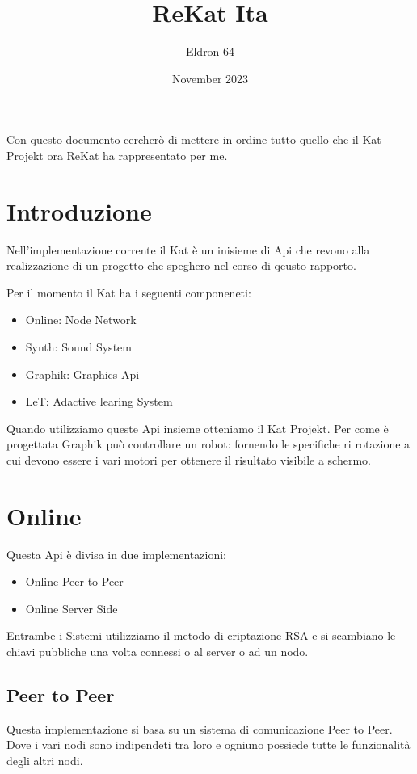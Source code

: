 \documentclass{article}
\title{ReKat Ita}
\author{Eldron 64}
\date{November 2023}
\begin{document}
	
\maketitle
Con questo documento cercherò di mettere in ordine tutto quello che il Kat Projekt ora ReKat ha rappresentato per me.

\section{Introduzione}
Nell'implementazione corrente il Kat è un inisieme di Api che revono alla realizzazione di un progetto che speghero nel corso di qeusto rapporto.

Per il momento il Kat ha i seguenti componeneti:

\begin{itemize}
    \item Online: Node Network
    \item Synth: Sound System 
    \item Graphik: Graphics Api 
    \item LeT: Adactive learing System
\end{itemize}

Quando utilizziamo queste Api insieme otteniamo il Kat Projekt. Per come è progettata Graphik può controllare un robot: fornendo le specifiche ri rotazione a cui devono essere i vari motori per ottenere il risultato visibile a schermo.

\section {Online}
Questa Api è divisa in due implementazioni: 

\begin{itemize}
    \item Online Peer to Peer
    \item Online Server Side
\end{itemize}

Entrambe i Sistemi utilizziamo il metodo di criptazione RSA e si scambiano le chiavi pubbliche una volta connessi o al server o ad un nodo.

\subsection{Peer to Peer}
Questa implementazione si basa su un sistema di comunicazione Peer to Peer. Dove i vari nodi sono indipendeti tra loro e ogniuno possiede tutte le funzionalità degli altri nodi. 
\end{document}
